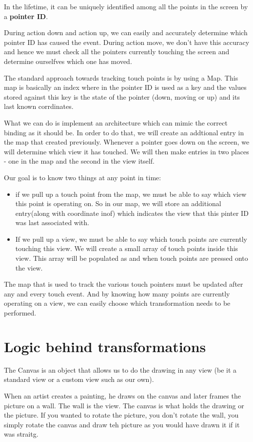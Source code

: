 \documentclass[11pt, a4paper]{book}
\begin{document}
In the lifetime, it can be uniquely identified among all the points in the
screen by a \textbf{pointer ID}.

During action down and action up, we can easily and accurately determine which
pointer ID has caused the event. During action move, we don't have this accuracy
and hence we must check all the pointers currently touching the screen and
determine ourselfves which one has moved. 

The standard approach towards tracking touch points is by using a Map. This map
is basically an index where in the pointer ID is used as a key and the values
stored against this key is the state of the pointer (down, moving or up) and its
last known corrdinates.

What we can do is implement an architecture which can mimic the correct binding
as it should be. In order to do that, we will create an addtional entry in the
map that created previously. Whenever a pointer goes down on the screen, we will
determine which view it has touched. We will then make entries in two places -
one in the map and the second in the view itself.

Our goal is to know two things at any point in time:
\begin{itemize}
\item if we pull up a touch point from the map, we must be able to say which
view this point is operating on. So in our map, we will store an additional
entry(along with coordinate inof) which indicates the view that this pinter ID
was last associated with.
\item If we pull up a view, we must be able to say which touch points are
currently touching this view. We will create a small array of touch points
inside this view. This array will be populated as and when touch points are
pressed onto the view.
\end{itemize}
The map that is used to track the various touch pointers must be updated after
any and every touch event. And by knowing how many points are currently
operating on a view, we can easily choose which transformation needs to be
performed. 
\section{Logic behind transformations}
The Canvas is an object that allows us to do the drawing in any view (be it a
standard view or a custom view such as our own). 

When an artist creates a painting, he draws on the canvas and later frames the
picture on a wall. The wall is the view. The canvas is what holds the drawing or
the picture. If you wanted to rotate the picture, you don't rotate the wall, you
simply rotate the canvas and draw teh picture as you would have drawn it if it
was straitg.
\end{document}
